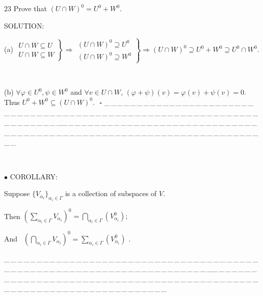 \documentclass[a4paper, 11pt, UTF8]{article}
\begin{document}
\begin{large}
{\timesbf\Large 23} {\timessl\Large Prove that $(U\cap W)^0=U^0+W^0$.}\par
{\timesbf S\footnotesize{OLUTION:}}\par\quad
(a) $\left.\begin{array}{r}U\cap W\subseteq U \\ U\cap W\subseteq W\end{array}\right\} \Rightarrow\left.\begin{array}{r}(U\cap W)^0\supseteq U^0 \\ (U\cap W)^0\supseteq W^0\end{array}\right\} \Rightarrow(U\cap W)^0\supseteq U^0+W^0\supseteq U^0\cap W^0.$\par{\tiny\,\par}\quad
(b) $\forall\varphi\in U^0,\psi\in W^0$ and $\forall v\in U\cap W$, $(\varphi+\psi)(v)=\varphi(v)+\psi(v)=0$. Thus $U^0+W^0\subseteq (U\cap W)^0.\,\,\,\,\square$
{\tiny \_\,\_\,\_\,\_\,\_\,\_\,\_\,\_\,\_\,\_\,\_\,\_\,\_\,\_\,\_\,\_\,\_\,\_\,\_\,\_\,\_\,\_\,\_\,\_\,\_\,\_\,\_\,\_\,\_\,\_\,\_\,\_\,\_\,\_\,\_\,\_\,\_\,\_\,\_\,\_\,\_\,\_\,\_\,\_\,\_\,\_\,\_\,\_\,\_\,\_\,\_\,\_\,\_\,\_\,\_\,\_\,\_\,\_\,\_\,\_\,\_\,\_\,\_\,\_\,\_\,\_\,\_\,\_\,\_\,\_\,\_\_\,\_\,\_\,\_\,\_\,\_\,\_\,\_\,\_\,\_\,\_\,\_\,\_\,\_\,\_\,\_\,\_\,\_\,\_\,\_\,\_\,\_\,\_\,\_\,\_\,\_\,\_\,\_\,\_\,\_\,\_\,\_\,\_\,\_\,\_\,\_\,\_\,\_\,\_\,\_\,\_\,\_\,\_\,\_\,\_\,\_\,\_\,\_\,\_\,\_\,\_\,\_\,\_\,\_\,\_\,\_\,\_\,\_\,\_\,\_\,\_\,\_\,\_\,\_\,\_\,\_\,\_\,\_\,\_\,\_\,\_}{\tiny\,\par}

{\small $\bullet$} {\timesbf C\small{OROLLARY:}}\par\quad
{\timessl Suppose} {\Large $\{V_{\alpha_i}\}_{\alpha_i\in\Gamma}$} {\timessl is a collection of subspaces of} {\Large $V$}.\par\quad
{\timessl Then} {\Large $(\sum_{\alpha_i\in\Gamma}V_{\alpha_i})^0=\bigcap_{\alpha_i\in\Gamma}(V^0_{\alpha_i})$;}\par\quad
{\timessl And} \,\,\,{\Large $(\bigcap_{\alpha_i\in\Gamma}V_{\alpha_i})^0=\sum_{\alpha_i\in\Gamma}(V^0_{\alpha_i})$
.}\par
{\tiny \_\,\_\,\_\,\_\,\_\,\_\,\_\,\_\,\_\,\_\,\_\,\_\,\_\,\_\,\_\,\_\,\_\,\_\,\_\,\_\,\_\,\_\,\_\,\_\,\_\,\_\,\_\,\_\,\_\,\_\,\_\,\_\,\_\,\_\,\_\,\_\,\_\,\_\,\_\,\_\,\_\,\_\,\_\,\_\,\_\,\_\,\_\,\_\,\_\,\_\,\_\,\_\,\_\,\_\,\_\,\_\,\_\,\_\,\_\,\_\,\_\,\_\,\_\,\_\,\_\,\_\,\_\,\_\,\_\,\_\,\_\_\,\_\,\_\,\_\,\_\,\_\,\_\,\_\,\_\,\_\,\_\,\_\,\_\,\_\,\_\,\_\,\_\,\_\,\_\,\_\,\_\,\_\,\_\,\_\,\_\,\_\,\_\,\_\,\_\,\_\,\_\,\_\,\_\,\_\,\_\,\_\,\_\,\_\,\_\,\_\,\_\,\_\,\_\,\_\,\_\,\_\,\_\,\_\,\_\,\_\,\_\,\_\,\_\,\_\,\_\,\_\,\_\,\_\,\_\,\_\,\_\,\_\,\_\,\_\,\_\,\_\,\_\,\_\,\_\,\_\,\_}{\tiny\,\par}


\end{large}
\end{document}
